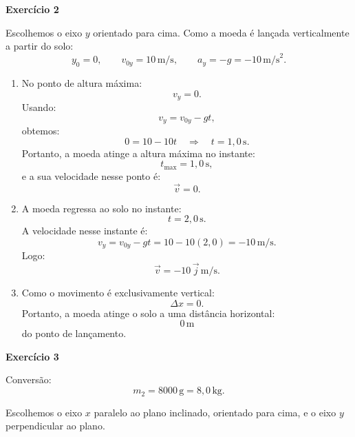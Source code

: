 \documentclass[12pt]{article}
\begin{document}
\vspace{0.2cm}

\textbf{Exercício 2}

Escolhemos o eixo $y$ orientado para cima. Como a moeda é lançada verticalmente a
partir do solo:
\[
y_0=0,
\qquad
v_{0y}=10\,\text{m/s},
\qquad
a_y=-g=-10\,\text{m/s}^2.
\]

\begin{enumerate}[label=\textbf{\alph*)}]
    \item No ponto de altura máxima:
    \[
    v_y=0.
    \]
    Usando:
    \[
    v_y=v_{0y}-gt,
    \]
    obtemos:
    \[
    0=10-10t
    \quad\Rightarrow\quad
    t=1,0\,\text{s}.
    \]
    Portanto, a moeda atinge a altura máxima no instante:
    \[
    t_{\max}=1,0\,\text{s},
    \]
    e a sua velocidade nesse ponto é:
    \[
    \vec{v}=0.
    \]

    \item A moeda regressa ao solo no instante:
    \[
    t=2,0\,\text{s}.
    \]
    A velocidade nesse instante é:
    \[
    v_y=v_{0y}-gt
    =10-10(2,0)
    =-10\,\text{m/s}.
    \]
    Logo:
    \[
    \vec{v}=-10\,\vec{j}\,\text{m/s}.
    \]

    \item Como o movimento é exclusivamente vertical:
    \[
    \Delta x=0.
    \]
    Portanto, a moeda atinge o solo a uma distância horizontal:
    \[
    0\,\text{m}
    \]
    do ponto de lançamento.
\end{enumerate}

\vspace{0.2cm}

\textbf{Exercício 3}

Conversão:
\[
m_2=8000\,\text{g}=8,0\,\text{kg}.
\]

Escolhemos o eixo $x$ paralelo ao plano inclinado, orientado para cima, e o eixo $y$
perpendicular ao plano.
\end{document}
